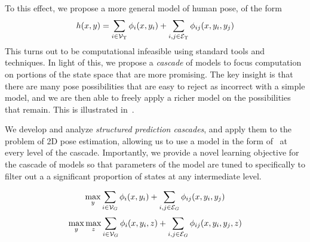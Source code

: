 To this effect, we propose a more general model of human pose, of the form 
\begin{equation}
h(x,y) =  \sum_{i \in \mathcal{V}_{\Upsilon}} \phi_i(x,y_i) + \sum_{i,j \in \mathcal{E}_{\Upsilon}} 
\phi_{ij}(x,y_i,y_j)
\label{eq:contrib1}
\end{equation}
This turns out to be computational infeasible using standard tools and techniques.  In light of this, we propose a {\em cascade} of models to focus computation on portions of the state space that are more promising.  The key insight is that there are many pose possibilities that are easy to reject as incorrect with a simple model, and we are then able to freely apply a richer model on the possibilities that remain.  This is illustrated in~.

We develop and analyze {\em structured prediction cascades}, and apply them to the problem of 2D pose estimation, allowing us to use a model in the form of~ at every level of the cascade.  Importantly, we provide a novel learning objective for the cascade of models so that parameters of the model are tuned to specifically to filter out a a significant proportion of states at any intermediate level. 


$$ \max_y \sum_{i \in \mathcal{V}_{G}} \phi_i(x,y_i) + \sum_{i,j\in  \mathcal{E}_{G}} \phi_{ij}(x,y_i,y_j) $$
$$ \max_y \max_z \sum_{i \in \mathcal{V}_{G}} \phi_i(x,y_i,z) + \sum_{i,j \in \mathcal{E}_{G}} \phi_{ij}(x,y_i,y_j,z)$$

